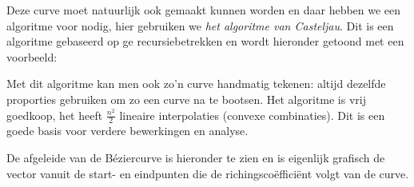 \documentclass[12pt,a4paper]{article}
\begin{document}
	Deze curve moet natuurlijk ook gemaakt kunnen worden en daar hebben we een algoritme voor nodig, hier gebruiken we \textit{het algoritme van Casteljau}. Dit is een algoritme gebaseerd op ge recursiebetrekken en wordt hieronder getoond met een voorbeeld: 
	\begin{figure}[H]
		\centering
		\label{fig:Casteljau}
	\end{figure}

	Met dit algoritme kan men ook zo'n curve handmatig tekenen: altijd dezelfde proporties gebruiken om zo een curve na te bootsen. Het algoritme is vrij goedkoop, het heeft $\tfrac{n^2}{2}$ lineaire interpolaties (convexe combinaties). Dit is een goede basis voor verdere bewerkingen en analyse. 
	
	De afgeleide van de Béziercurve is hieronder te zien en is eigenlijk grafisch de vector vanuit de start- en eindpunten die de richingscoëfficiënt volgt van de curve. 
	\begin{figure}[H]
		\centering
		\label{fig:Bézier-afgeleiden}
	\end{figure}
	
\end{document}
